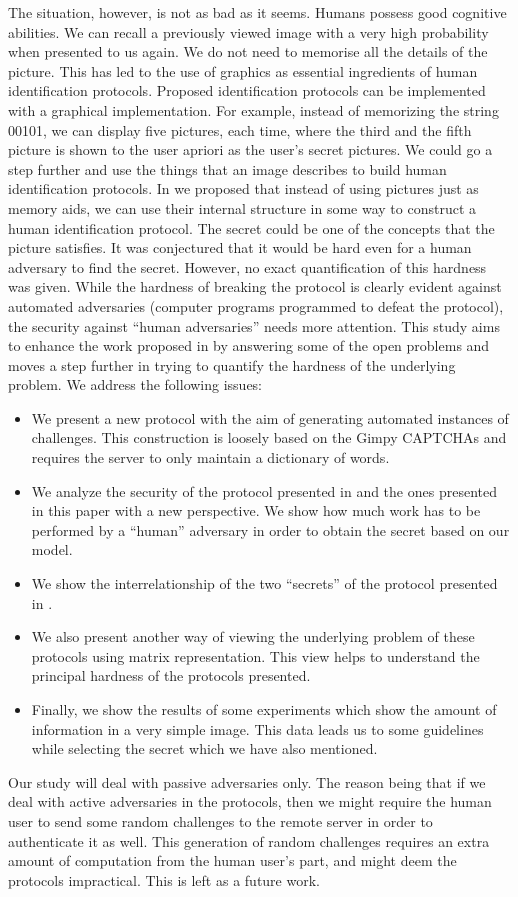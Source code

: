 \documentclass{llncs}
\begin{document}
The situation, however, is not as bad as it seems. Humans possess good cognitive abilities. We can recall a previously viewed image with a very high probability when presented to us again. We do not need to memorise all the details of the picture. This has led to the use of graphics as essential ingredients of human identification protocols. Proposed identification protocols can be implemented with a graphical implementation. For example, instead of memorizing the string 00101, we can display five pictures, each time, where the third and the fifth picture is shown to the user apriori as the user's secret pictures. We could go a step further and use the things that an image describes to build human identification protocols. In \cite{hassan} we proposed that instead of using pictures just as memory aids, we can use their internal structure in some way to construct a human identification protocol. The secret could be one of the concepts that the picture satisfies. It was conjectured that it would be hard even for a human adversary to find the secret. However, no exact quantification of this hardness was given. While the hardness of breaking the protocol is clearly evident against automated adversaries (computer programs programmed to defeat the protocol), the security against ``human adversaries'' needs more attention. This study aims to enhance the work proposed in \cite{hassan} by answering some of the open problems and moves a step further in trying to quantify the hardness of the underlying problem. We address the following issues:
\begin{itemize}
\item We present a new protocol with the aim of generating automated instances of challenges. This construction is loosely based on the Gimpy CAPTCHAs \cite{gimpy} and requires the server to only maintain a dictionary of words.
\item We analyze the security of the protocol presented in \cite{hassan} and the ones presented in this paper with a new perspective. We show how much work has to be performed by a ``human'' adversary in order to obtain the secret based on our model.
\item We show the interrelationship of the two ``secrets'' of the protocol presented in \cite{hassan}.
\item We also present another way of viewing the underlying problem of these protocols using matrix representation. This view helps to understand the principal hardness of the protocols presented.
\item Finally, we show the results of some experiments which show the amount of information in a very simple image. This data leads us to some guidelines while selecting the secret which we have also mentioned.
\end{itemize}
Our study will deal with passive adversaries only. The reason being that if we deal with active adversaries in the protocols, then we might require the human user to send some random challenges to the remote server in order to authenticate it as well. This generation of random challenges requires an extra amount of computation from the human user's part, and might deem the protocols impractical. This is left as a future work.    
\end{document}
